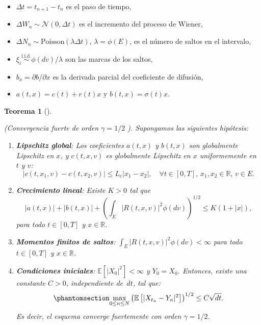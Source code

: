 \documentclass[
  spanish,
  us-letterpaper,
]{scrreprt}
\providecommand{\tightlist}{%
  \setlength{\itemsep}{0pt}\setlength{\parskip}{0pt}}
\theoremstyle{plain}
\newtheorem{theorem}{Teorema}[chapter]
\theoremstyle{plain}
\theoremstyle{definition}
\theoremstyle{remark}
\begin{document}
\begin{itemize}
\tightlist
\item
  \(\Delta t = t_{n+1} - t_n\) es el paso de tiempo,
\item
  \(\Delta W_n \sim \mathcal{N}(0, \Delta t)\) es el incremento del
  proceso de Wiener,
\item
  \(\Delta N_n \sim \text{Poisson}(\lambda \Delta t)\),
  \(\lambda = \phi(E)\), es el número de saltos en el intervalo,
\item
  \(\xi_i \stackrel{\text{i.i.d.}}{\sim} \phi(dv)/\lambda\) son las
  marcas de los saltos,
\item
  \(b_x = \partial b / \partial x\) es la derivada parcial del
  coeficiente de difusión,
\item
  \(a(t, x) = c(t) + r(t)x\) y \(b(t, x) = \sigma(t)x\).
\end{itemize}

\begin{theorem}[]\protect\hypertarget{thm-convergencia_fuerte}{}\label{thm-convergencia_fuerte}

(Convergencia fuerte de orden \(\gamma = 1/2\) ). Supongamos las
siguientes hipótesis:

\begin{enumerate}
\def\labelenumi{\arabic{enumi}.}
\item
  \textbf{Lipschitz global}: Los coeficientes \(a(t,x)\) y \(b(t,x)\)
  son globalmente Lipschitz en \(x\), y \(c(t,x,v)\) es globalmente
  Lipschitz en \(x\) uniformemente en \(t\) y \(v\):
  \[|c(t, x_1, v) - c(t, x_2, v)| \leq L_c |x_1 - x_2|, \quad \forall t \in [0,T], \, x_1, x_2 \in \mathbb{R}, \, v \in E.\]
\item
  \textbf{Crecimiento lineal}: Existe \(K > 0\) tal que
  \[|a(t,x)| + |b(t,x)| + \left( \int_E |R(t, x, v)|^2 \phi(d v) \right)^{1/2} \leq K(1 + |x|),\]
  para todo \(t \in [0,T]\) y \(x \in \mathbb{R}\).
\item
  \textbf{Momentos finitos de saltos}:
  \(\int_E |R(t, x, v)|^2 \phi(d v) < \infty\) para todo \(t \in [0,T]\)
  y \(x \in \mathbb{R}\).
\item
  \textbf{Condiciones iniciales}: \(\mathbb{E}[|X_0|^2] < \infty\) y
  \(Y_0 = X_0\). Entonces, existe una constante \(C > 0\), independiente
  de \(\, dt\), tal que:
  \begin{equation}\protect\phantomsection\label{eq-convergencia}{\max_{0 \leq n \leq N} \left( \mathbb{E}\left[ |X_{t_n} - Y_n|^2 \right] \right)^{1/2} \leq C \sqrt{dt}.}\end{equation}
  Es decir, el esquema converge fuertemente con orden \(\gamma = 1/2\).
\end{enumerate}

\end{theorem}
\end{document}
